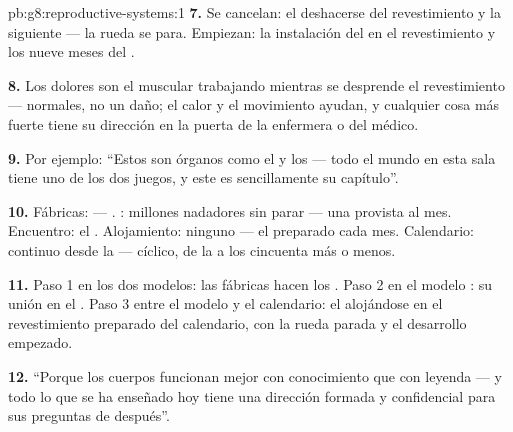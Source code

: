 \begin{solution}{pb:g8:reproductive-systems:1}
\textbf{7.} Se cancelan: el deshacerse del revestimiento y la
 siguiente --- la rueda se para. Empiezan: la instalación
del  en el revestimiento y los nueve meses del .

\textbf{8.} Los dolores son el  muscular trabajando mientras se
desprende el revestimiento --- normales, no un daño; el calor y el
movimiento ayudan, y cualquier cosa más fuerte tiene su dirección en la
puerta de la enfermera o del médico.

\textbf{9.} Por ejemplo: ``Estos son órganos como el  y los
 --- todo el mundo en esta sala tiene uno de los dos juegos, y
este es sencillamente su capítulo''.

\textbf{10.} Fábricas:  --- . : millones
nadadores sin parar --- una   provista al mes. Encuentro:
el . Alojamiento: ninguno --- el  preparado cada mes.
Calendario: continuo desde la  --- cíclico, de la  a
los cincuenta más o menos.

\textbf{11.} Paso 1 en los dos modelos: las fábricas hacen los .
Paso 2 en el modelo : su unión en el . Paso 3 entre el
modelo y el calendario: el  alojándose en el revestimiento
preparado del calendario, con la rueda parada y el desarrollo empezado.

\textbf{12.} ``Porque los cuerpos funcionan mejor con conocimiento que
con leyenda --- y todo lo que se ha enseñado hoy tiene una dirección
formada y confidencial para sus preguntas de después''.
\end{solution}
